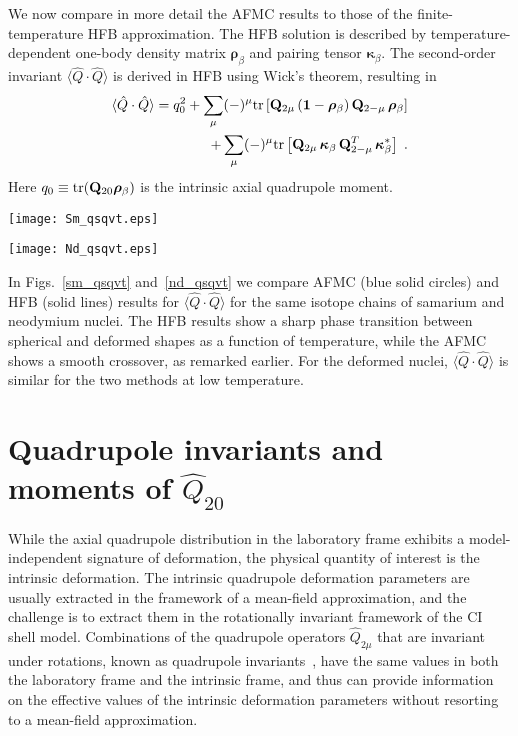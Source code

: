 \documentclass[prc,twocolumn,aps,showpacs,floatfix,nofootinbib,letterpaper,preprintnumbers]{revtex4-1}
\begin{document}
We now compare in more detail the AFMC results to those of the finite-temperature HFB approximation. The HFB solution is described by temperature-dependent one-body density matrix $\boldsymbol \rho_\beta$ and pairing tensor $\boldsymbol \kappa_\beta$.  The second-order invariant $\langle \hat Q\cdot \hat Q\rangle$ is derived in HFB 
using Wick's theorem, resulting in
\begin{eqnarray}\label{Q^2_HFB}
\langle \hat Q\cdot \hat Q\rangle = q_0^2 + \sum_\mu (-)^\mu {\rm tr}\left[{\bf Q}_{2\mu}\, ({\bf 1}-\boldsymbol \rho_\beta)\, {\bf Q}_{2 -\mu}\, \boldsymbol \rho_\beta\right] \nonumber \\ + \sum_\mu (-)^\mu {\rm tr}\left[{\bf Q}_{2\mu}\, \boldsymbol \kappa_\beta \,{\bf Q}^T_{2 -\mu}\, \boldsymbol \kappa_\beta^\ast\right] \;.
\end{eqnarray}
Here $ q_0 \equiv {\rm tr} ({\bf Q}_{20} \boldsymbol \rho_\beta)$  is the intrinsic axial quadrupole moment.  

\begin{figure*}[htb]
  \texttt{[image: Sm\_qsqvt.eps]}
    \caption{$\langle \hat Q \cdot \hat Q\rangle$ for Sm isotopes. The AFMC results (solid circles) are compared with the HFB results (solid lines).}
    \label{sm_qsqvt}
\end{figure*} 

\begin{figure*}[htb]
  \texttt{[image: Nd\_qsqvt.eps]}
    \caption{$\langle \hat Q \cdot \hat Q\rangle$ for Nd isotopes. Symbols and lines are as in Fig.~\ref{sm_qsqvt}.}
    \label{nd_qsqvt}
\end{figure*} 

In Figs.~\ref{sm_qsqvt} and~\ref{nd_qsqvt} we compare AFMC (blue solid circles) and HFB (solid lines) results for $\langle \hat Q \cdot \hat Q\rangle$ for the same isotope chains of samarium and neodymium nuclei. The HFB results show a sharp phase transition between spherical and deformed shapes as a function of temperature, while the AFMC shows a smooth crossover, as remarked earlier. For the deformed nuclei, $\langle \hat Q \cdot \hat Q\rangle$ is similar for the two methods at low temperature. 

\section{Quadrupole invariants and moments of $\hat Q_{20}$}\label{invariants}

While the axial quadrupole distribution in the laboratory frame exhibits a model-independent signature of deformation, the physical quantity of interest is the intrinsic deformation.  The intrinsic quadrupole deformation parameters are usually extracted in the framework of a mean-field approximation, and the challenge is to extract them in the rotationally invariant framework of the CI shell model. Combinations of the quadrupole operators $\hat Q_{2\mu}$ that are invariant under rotations, known as quadrupole invariants~\cite{ku72,cl86}, have the same values in both the laboratory frame and the intrinsic frame, and thus can provide information on the effective values of the intrinsic deformation parameters without resorting to a mean-field approximation. 
\end{document}
